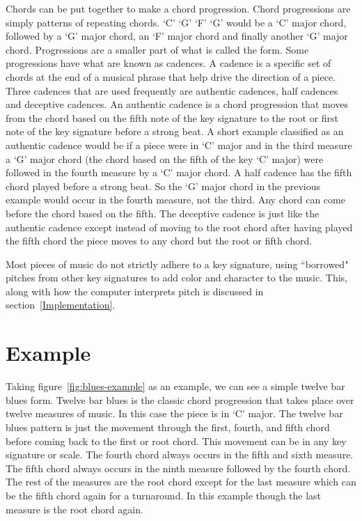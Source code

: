 \documentclass[12pt]{ucthesis}
\begin{document}
Chords can be put together to make a chord progression. Chord progressions are simply patterns of repeating chords. `C' `G' `F' `G' would be a `C' major chord, followed by a `G' major chord, an `F' major chord and finally another `G' major chord. Progressions are a smaller part of what is called the form. Some progressions have what are known as cadences. A cadence is a specific set of chords at the end of a musical phrase that help drive the direction of a piece. Three cadences that are used frequently are authentic cadences, half cadences and deceptive cadences. An authentic cadence is a chord progression that moves from the chord based on the fifth note of the key signature to the root or first note of the key signature before a strong beat. A short example classified as an authentic cadence would be if a piece were in `C' major and in the third measure a `G' major chord (the chord based on the fifth of the key `C' major) were followed in the fourth measure by a `C' major chord. A half cadence has the fifth chord played before a strong beat. So the `G' major chord in the previous example would occur in the fourth measure, not the third. Any chord can come before the chord based on the fifth. The deceptive cadence is just like the authentic cadence except instead of moving to the root chord after having played the fifth chord the piece moves to any chord but the root or fifth chord. 

Most pieces of music do not strictly adhere to a key signature, using ``borrowed" pitches from other key signatures to add color and character to the music. This, along with how the computer interprets pitch is discussed in section~\ref{Implementation}.

\section{Example}

Taking figure~\ref{fig:blues-example} as an example, we can see a simple twelve bar blues form. Twelve bar blues is the classic chord progression that takes place over twelve measures of music. In this case the piece is in `C' major. The twelve bar blues pattern is just the movement through the first, fourth, and fifth chord before coming back to the first or root chord. This movement can be in any key signature or scale. The fourth chord always occurs in the fifth and sixth measure. The fifth chord always occurs in the ninth measure followed by the fourth chord. The rest of the measures are the root chord except for the last measure which can be the fifth chord again for a turnaround. In this example though the last measure is the root chord again.
\end{document}
